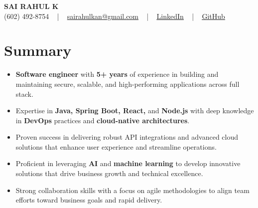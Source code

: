 \documentclass[letterpaper,11pt]{article}
\newcommand{\resumeItem}[1]{
  \item\footnotesize{
    {#1 \vspace{-2pt}}
  }
}
\newcommand{\resumeItemListStart}{\begin{itemize}[leftmargin=*]}
\newcommand{\resumeItemListEnd}{\end{itemize}\vspace{-5pt}}
\begin{document}
\begin{center}
    {\fontsize{14pt}{12pt}\selectfont \textbf{\MakeUppercase{Sai Rahul K}}}\\ \vspace{2pt}
    \fontsize{10pt}{12pt}\selectfont (602) 492-8754 ~ | ~ \href{mailto:sairahulkan@gmail.com}{sairahulkan@gmail.com} ~ | ~
    \href{https://www.linkedin.com/in/rq123/}{\color{blue}\underline{LinkedIn}} ~ | ~
    \href{https://github.com/kanrahuldo}{\color{blue}\underline{GitHub}}~
    \vspace{-8pt}
\end{center}

\section{Summary}
\fontsize{9pt}{10pt}\selectfont
\resumeItemListStart
    \resumeItem{\textbf{Software engineer} with \textbf{5+ years} of experience in building and maintaining secure, scalable, and high-performing applications across full stack.} \vspace{-3pt}
    \resumeItem{Expertise in \textbf{Java, Spring Boot, React,} and \textbf{Node.js} with deep knowledge in \textbf{DevOps} practices and \textbf{cloud-native architectures}.} \vspace{-3pt}
    \resumeItem{Proven success in delivering robust API integrations and advanced cloud solutions that enhance user experience and streamline operations.} \vspace{-3pt}
    \resumeItem{Proficient in leveraging \textbf{AI} and \textbf{machine learning} to develop innovative solutions that drive business growth and technical excellence.} \vspace{-3pt}
    \resumeItem{Strong collaboration skills with a focus on agile methodologies to align team efforts toward business goals and rapid delivery.} \vspace{-6pt}
\resumeItemListEnd
\vspace{-6pt}
\end{document}
